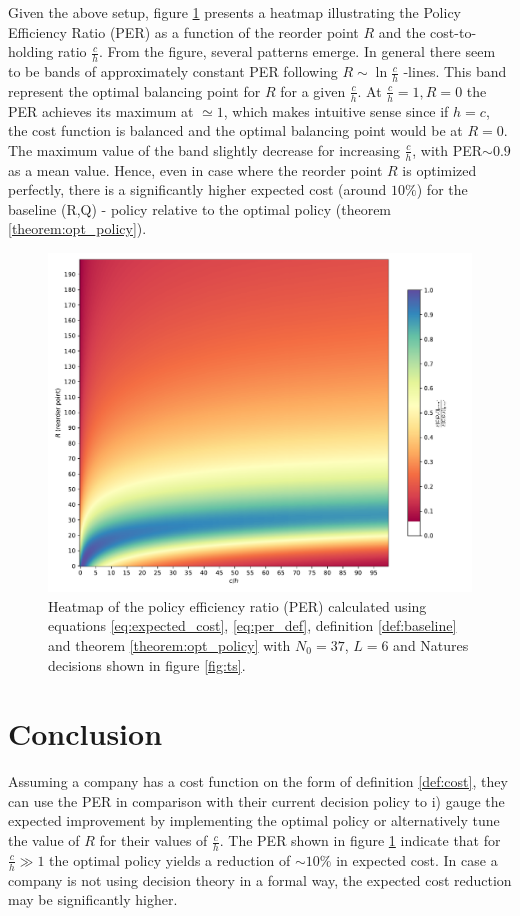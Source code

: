 \documentclass[a4paper,12pt]{article}
\begin{document}
	Given the above setup, figure \ref{fig:per} presents a heatmap illustrating the Policy Efficiency Ratio (PER) as a function of the reorder point $R$ and the cost-to-holding ratio $\frac{c}{h}$. From the figure, several patterns emerge. In general there seem to be bands of approximately constant PER following $R\sim \ln\frac{c}{h}$ -lines. This band represent the optimal balancing point for $R$ for a given $\frac{c}{h}$. At $\frac{c}{h}=1, R=0$ the PER achieves its maximum at $\simeq 1$, which makes intuitive sense since if $h=c$, the cost function is balanced and the optimal balancing point would be at $R=0$. The maximum value of the band slightly decrease for increasing $\frac{c}{h}$, with PER$\sim 0.9$ as a mean value. Hence, even in case where the reorder point $R$ is optimized perfectly, there is a significantly higher expected cost (around $10\%$) for the baseline (R,Q) - policy relative to the optimal policy (theorem \ref{theorem:opt_policy}). 
	\begin{figure}[h!]
		\centering
		\includegraphics[width=1\textwidth]{figures/per.pdf}
		\caption{Heatmap of the policy efficiency ratio (PER) calculated using equations \eqref{eq:expected_cost}, \eqref{eq:per_def}, definition \ref{def:baseline} and theorem \ref{theorem:opt_policy} with $N_0=37$, $L=6$ and Natures decisions shown in figure \ref{fig:ts}.}
		\label{fig:per}
	\end{figure}

	
	\section{Conclusion}
	Assuming a company has a cost function on the form of definition \ref{def:cost}, they can use the PER in comparison with their current decision policy to i) gauge the expected improvement by implementing the optimal policy or alternatively tune the value of $R$ for their values of $\frac{c}{h}$. The PER shown in figure \ref{fig:per} indicate that for $\frac{c}{h}\gg 1$ the optimal policy yields a reduction of $\sim 10\%$ in expected cost. In case a company is not using decision theory in a formal way, the expected cost reduction may be significantly higher. 
	

	\newpage
	\begin{appendices}
		
		
		
	\end{appendices}
	
	
	
	
	
\end{document}
